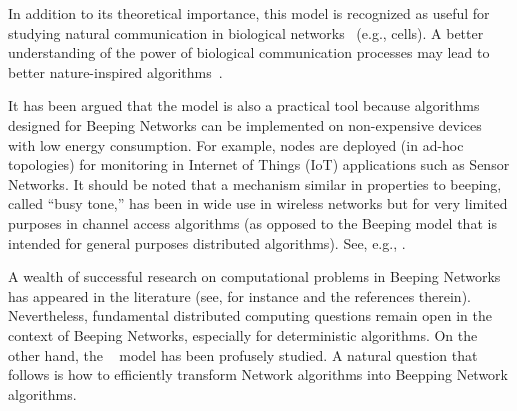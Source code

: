  

In addition to its theoretical importance, 
this model is recognized as useful for studying natural communication in biological networks~\cite{navlakha2014distributed,afek2011biological} (e.g., 
cells). A better understanding of the power of biological communication processes may lead to better nature-inspired algorithms~\cite{MooreNeuron24}.  

It has been argued that the model is also a practical tool because algorithms designed for Beeping Networks can be implemented on non-expensive devices with low energy consumption. For example, nodes are deployed (in ad-hoc topologies) for monitoring in Internet of Things (IoT) applications such as Sensor Networks. It should be noted that a mechanism similar in properties to beeping, called ``busy tone,'' has been in wide use in wireless networks but for very limited purposes in channel access algorithms (as opposed to the Beeping model that is intended for general purposes distributed algorithms). See, e.g., \cite{tobagi1975packet,haas2002dual}.  

 




A wealth of successful research on computational problems in Beeping Networks has appeared in the literature (see, for instance \cite{beauquier2018fast,dufoulon2022beeping} and the references therein). Nevertheless, fundamental distributed computing questions 
remain open in the context of Beeping Networks, especially for deterministic algorithms. 
On the other hand, the \congest ~\cite{peleg2000distributed} model has been profusely studied.
%
%
A natural question that follows is how to efficiently transform \congest Network algorithms into Beepping Network algorithms. 

 


\vspace*{-1ex}
